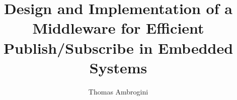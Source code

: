 
\newcommand{\mytitle}{Design and Implementation of a Middleware for Efficient
       Publish/Subscribe in Embedded Systems}

\title{Design and Implementation of a Middleware for Efficient
       Publish/Subscribe in Embedded Systems}

\author{Thomas Ambrogini}

